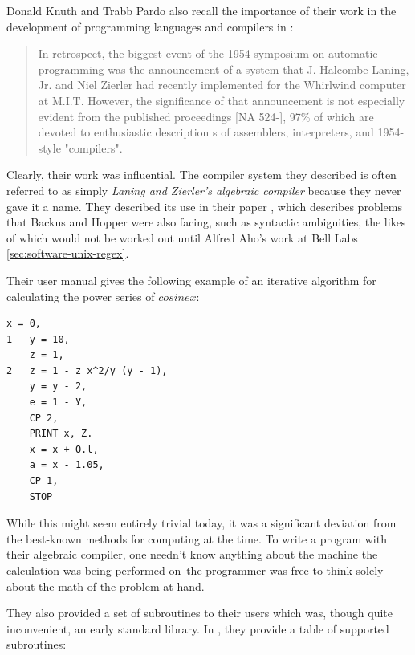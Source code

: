 Donald Knuth and Trabb Pardo also recall the importance of their work in
the development of programming languages and compilers
in :

\begin{quotation}
	In retrospect, the biggest event of the 1954 symposium on automatic
	programming was the announcement of a system that J. Halcombe Laning, Jr. and Niel Zierler
	had recently implemented for the Whirlwind computer at M.I.T.  However, the
	significance of that announcement is not especially evident from the published
	proceedings [NA 524-], 97\% of which are devoted to enthusiastic description s
	of assemblers, interpreters, and 1954-style "compilers".
\end{quotation}

Clearly, their work was influential.
The compiler system they described is often referred to as simply
\textit{Laning and Zierler's algebraic compiler}
because they never gave it a name.
They described its use in their paper ,
which describes problems that Backus and Hopper were also facing, such as syntactic ambiguities,
the likes of which would not be worked out until Alfred Aho's work at Bell Labs
\ref{sec:software-unix-regex}.

Their user manual gives the following example of an iterative algorithm for
calculating the power series of $cosine x$:

\begin{lstlisting}[frame=single]
    x = 0,
1   y = 10,
    z = 1,
2   z = 1 - z x^2/y (y - 1),
    y = y - 2,
    e = 1 - У,
    CP 2,
    PRINT x, Z.
    x = x + O.l,
    a = x - 1.05,
    CP 1,
    STOP
\end{lstlisting}

While this might seem entirely trivial today, it was a significant deviation from the
best-known methods for computing at the time. To write a program with their algebraic
compiler, one needn't know anything about the machine the calculation was being performed on--the
programmer was free to think solely about the math of the problem at hand.

They also provided a set of subroutines to their users which was, though quite inconvenient,
an early standard library.
In \cite[Section 11. Function Subroutines]{laning_zierler_algebraic_compiler_manual_1954},
they provide a table of supported subroutines:

